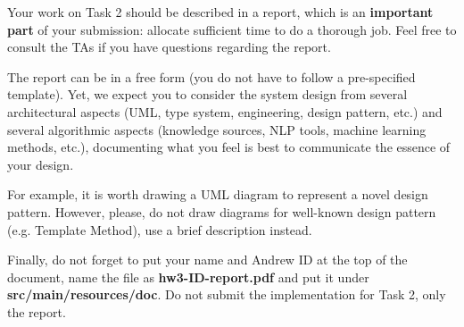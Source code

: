 \documentclass[oneside,11pt]{memoir}
\begin{document}
Your work on Task 2 should be described in a report, 
which is an \textbf{important part} of your submission: 
allocate sufficient time to do a thorough job. 
Feel free to consult the TAs if you have questions regarding the report.

The report can be in a free form (you do not have to follow a pre-specified template).
Yet, we expect you to consider the system design from several architectural aspects (UML, type
system, engineering, design pattern, etc.) and several algorithmic aspects (knowledge sources, NLP
tools, machine learning methods, etc.), documenting what you feel is best to communicate
the essence of your design. 

For example, it is worth drawing a UML diagram to represent a novel design pattern.
However, please, do not draw diagrams
for well-known design pattern (e.g. Template Method), use a brief description instead.

Finally, do not forget to put
your name and Andrew ID at the top of the document, 
name the file as \textbf{hw3-ID-report.pdf} and put it
under \textbf{src/main/resources/doc}. 
Do not submit the implementation for Task 2, only the report.




%
\end{document}

